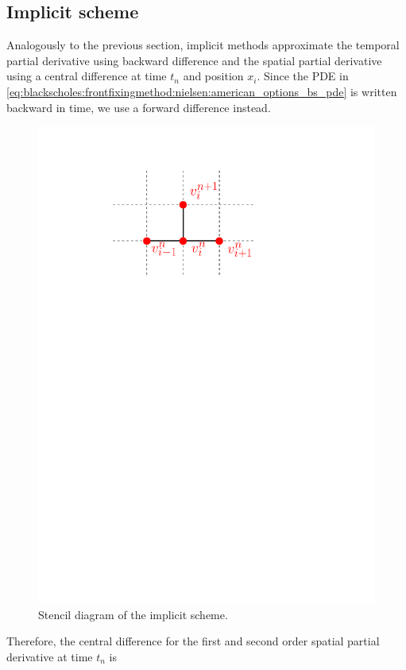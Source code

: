 \subsection{Implicit scheme}
Analogously to the previous section, implicit methods approximate the temporal partial derivative using backward difference and the spatial partial derivative using a central difference at time $t_n$ and position $x_i$. Since the PDE in \eqref{eq:blackscholes:frontfixingmethod:nielsen:american_options_bs_pde} is written backward in time, we use a forward difference instead.
\begin{figure}[H]
  \centering
  \includegraphics[scale=.8]{chapters/chapter3/ImplicitStencil.pdf}
  \caption{Stencil diagram of the implicit scheme.}
  \label{fig:finitedifferencesschemes:implicit_stencil}
\end{figure}
Therefore, the central difference for the first and second order spatial partial derivative at time $t_n$ is 
